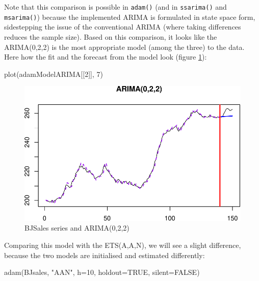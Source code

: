 \documentclass[
]{book}
\newenvironment{Shaded}{\begin{snugshade}}{\end{snugshade}}
\newcommand{\AttributeTok}[1]{\textcolor[rgb]{0.77,0.63,0.00}{#1}}
\newcommand{\ConstantTok}[1]{\textcolor[rgb]{0.00,0.00,0.00}{#1}}
\newcommand{\DecValTok}[1]{\textcolor[rgb]{0.00,0.00,0.81}{#1}}
\newcommand{\FunctionTok}[1]{\textcolor[rgb]{0.00,0.00,0.00}{#1}}
\newcommand{\NormalTok}[1]{#1}
\newcommand{\StringTok}[1]{\textcolor[rgb]{0.31,0.60,0.02}{#1}}
\theoremstyle{definition}
\theoremstyle{definition}
\theoremstyle{definition}
\theoremstyle{definition}
\theoremstyle{remark}
\begin{document}
Note that this comparison is possible in \texttt{adam()} (and in \texttt{ssarima()} and \texttt{msarima()}) because the implemented ARIMA is formulated in state space form, sidestepping the issue of the conventional ARIMA (where taking differences reduces the sample size). Based on this comparison, it looks like the ARIMA(0,2,2) is the most appropriate model (among the three) to the data. Here how the fit and the forecast from the model look (figure \ref{fig:adamARIMAPlotBJSales}):

\begin{Shaded}
\begin{Highlighting}[]
\FunctionTok{plot}\NormalTok{(adamModelARIMA[[}\DecValTok{2}\NormalTok{]], }\DecValTok{7}\NormalTok{)}
\end{Highlighting}
\end{Shaded}

\begin{figure}
\centering
\includegraphics{adam_files/figure-latex/adamARIMAPlotBJSales-1.pdf}
\caption{\label{fig:adamARIMAPlotBJSales}BJSales series and ARIMA(0,2,2)}
\end{figure}

Comparing this model with the ETS(A,A,N), we will see a slight difference, because the two models are initialised and estimated differently:

\begin{Shaded}
\begin{Highlighting}[]
\FunctionTok{adam}\NormalTok{(BJsales, }\StringTok{"AAN"}\NormalTok{, }\AttributeTok{h=}\DecValTok{10}\NormalTok{, }\AttributeTok{holdout=}\ConstantTok{TRUE}\NormalTok{, }\AttributeTok{silent=}\ConstantTok{FALSE}\NormalTok{)}
\end{Highlighting}
\end{Shaded}
\end{document}
